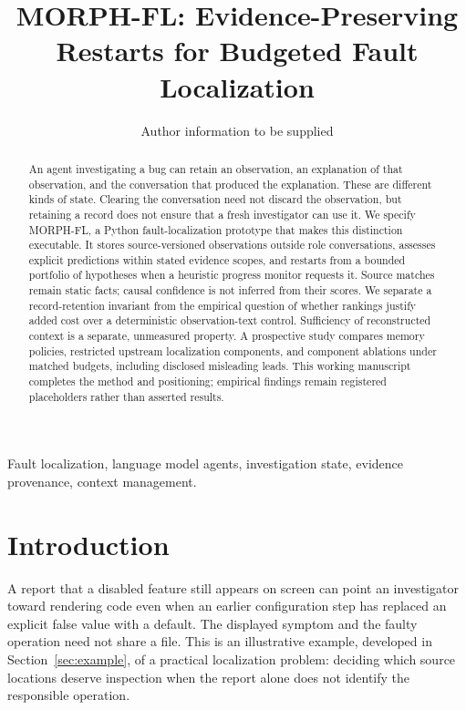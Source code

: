 \documentclass[letterpaper,journal]{IEEEtran}
\newcommand{\tool}{MORPH-FL}
\begin{document}
\title{MORPH-FL: Evidence-Preserving Restarts for Budgeted Fault Localization}
\author{Author information to be supplied}
\maketitle
\begin{abstract}
An agent investigating a bug can retain an observation, an explanation of that observation, and the conversation that produced the explanation. These are different kinds of state. Clearing the conversation need not discard the observation, but retaining a record does not ensure that a fresh investigator can use it. We specify \tool{}, a Python fault-localization prototype that makes this distinction executable. It stores source-versioned observations outside role conversations, assesses explicit predictions within stated evidence scopes, and restarts from a bounded portfolio of hypotheses when a heuristic progress monitor requests it. Source matches remain static facts; causal confidence is not inferred from their scores. We separate a record-retention invariant from the empirical question of whether rankings justify added cost over a deterministic observation-text control. Sufficiency of reconstructed context is a separate, unmeasured property. A prospective study compares memory policies, restricted upstream localization components, and component ablations under matched budgets, including disclosed misleading leads. This working manuscript completes the method and positioning; empirical findings remain registered placeholders rather than asserted results.
\end{abstract}
\begin{IEEEkeywords}
Fault localization, language model agents, investigation state, evidence provenance, context management.
\end{IEEEkeywords}

\section{Introduction}\label{sec:intro}
A report that a disabled feature still appears on screen can point an investigator toward rendering code even when an earlier configuration step has replaced an explicit false value with a default. The displayed symptom and the faulty operation need not share a file. This is an illustrative example, developed in Section~\ref{sec:example}, of a practical localization problem: deciding which source locations deserve inspection when the report alone does not identify the responsible operation.
\end{document}
